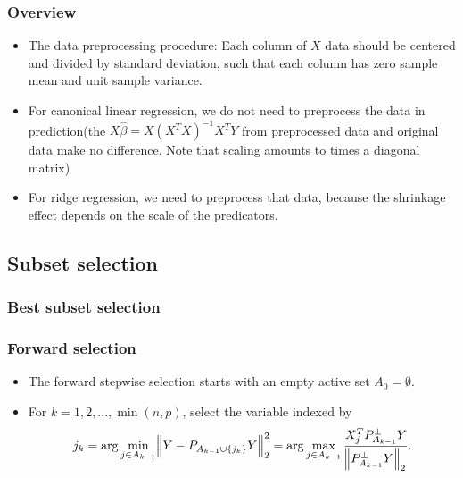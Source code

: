 \begin{refsection}
\subsubsection{Overview}

\begin{remark}\hfill
	\begin{itemize}
		\item The data preprocessing procedure:  Each column of $X$ data should be centered and divided by standard deviation, such that each column has zero sample mean and unit sample variance.
		\item For canonical linear regression, we do not need to preprocess the data in prediction(the $X\hat{\beta} = X(X^TX)^{-1} X^TY$ from preprocessed data and original data make no difference. Note that scaling amounts to times a diagonal matrix)
		\item For ridge regression, we need to preprocess that data, because the shrinkage effect depends on the scale of the predicators.  
	\end{itemize}
\end{remark}


\subsection{Subset selection}

\subsubsection{Best subset selection}




\begin{lemma}
	
\end{lemma}

\subsubsection{Forward selection}



\begin{method}
	\begin{itemize}
		\item The forward stepwise selection starts with an empty active set $A_0 = \emptyset$.
		\item  For $k=1,2,...,\min(n,p)$, select the variable indexed by
		$$j_k = \arg\min_{j\in A_{k-1}} \norm{Y- P_{A_{k-1}\cup \{j_k\}}Y}_2^2 = \arg\max_{j\in A_{k-1}}\frac{X_j^TP^{\perp}_{A_{k-1}}Y}{\norm{P^{\perp}_{A_{k-1}}Y}_2}.$$
	\end{itemize}	
	

\end{method}
\end{refsection}

